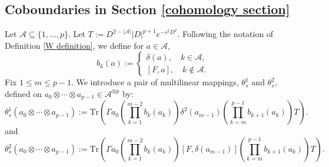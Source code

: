 
\subsection{Coboundaries in Section \ref{cohomology section}}
    Let $\mathscr{A} \subseteq \{1,\ldots,p\}$. Let $T :=D^{2-|\mathscr{A}|}|D|^{p+1}e^{-s^2D^2}.$
    Following the notation of Definition \ref{W definition}, we define
    for $a \in \mathcal{A}$,
    \begin{equation*}
        b_k(a) := \begin{cases}
                      \delta(a),\quad k \in \mathscr{A},\\
                      [F,a],\quad k\notin \mathscr{A}.
                  \end{cases}
    \end{equation*}
    Fix $1\leq m\leq p-1$. We introduce a pair of multilinear mappings, $\theta_s^1$ and $\theta_s^2$, defined on $a_0\otimes\cdots\otimes a_{p-1} \in \mathcal{A}^{\otimes p}$ by:
    \begin{equation*}
        \theta_s^1(a_0\otimes\cdots\otimes a_{p-1}) := \mathrm{Tr}\left(\Gamma a_0\left(\prod_{k=1}^{m-2}b_k(a_k)\right)\delta^2(a_{m-1})\left(\prod_{k=m}^{p-1}b_{k+1}(a_k)\right)T\right).
    \end{equation*}
    and
    \begin{equation*}
        \theta_s^2(a_0\otimes\cdots\otimes a_{p-1}) := \mathrm{Tr}\left(\Gamma a_0\left(\prod_{k=1}^{m-2}b_k(a_k)\right)[F,\delta(a_{m-1})]\left(\prod_{k=m}^{p-1}b_{k+1}(a_k)\right)T\right).
    \end{equation*}
    
